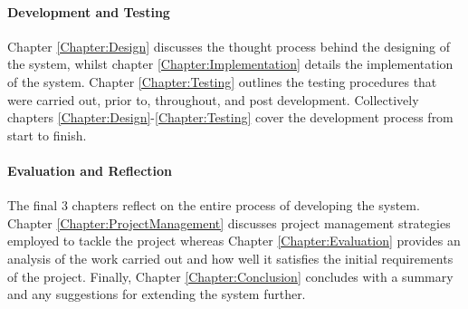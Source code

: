 \paragraph{Development and Testing}
Chapter \ref{Chapter:Design} discusses the thought process behind the designing of the system, whilst chapter \ref{Chapter:Implementation} details the implementation of the system. Chapter \ref{Chapter:Testing} outlines the testing procedures that were carried out, prior to, throughout, and post development. Collectively chapters \ref{Chapter:Design}-\ref{Chapter:Testing} cover the development process from start to finish.

\paragraph{Evaluation and Reflection}
The final 3 chapters reflect on the entire process of developing the system. Chapter \ref{Chapter:ProjectManagement} discusses project management strategies employed to tackle the project whereas Chapter \ref{Chapter:Evaluation} provides an analysis of the work carried out and how well it satisfies the initial requirements of the project. Finally, Chapter \ref{Chapter:Conclusion} concludes with a summary and any suggestions for extending the system further.
